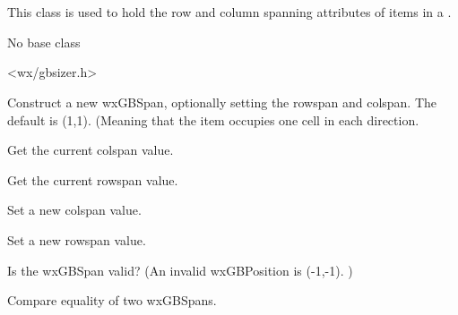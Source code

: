
\section{}\label{wxgbspan}

This class is used to hold the row and column spanning attributes of
items in a .


No base class


<wx/gbsizer.h>



\label{wxgbspanwxgbspan}



Construct a new wxGBSpan, optionally setting the rowspan and colspan.
The default is (1,1).  (Meaning that the item occupies one cell in
each direction.


\label{wxgbspangetcolspan}


Get the current colspan value.


\label{wxgbspangetrowspan}


Get the current rowspan value.


\label{wxgbspansetcolspan}


Set a new colspan value.


\label{wxgbspansetrowspan}


Set a new rowspan value.


\label{wxgbspanoperatorunknown}


Is the wxGBSpan valid?  (An invalid wxGBPosition is (-1,-1). )


\label{wxgbspanoperatorequal}


Compare equality of two wxGBSpans.
